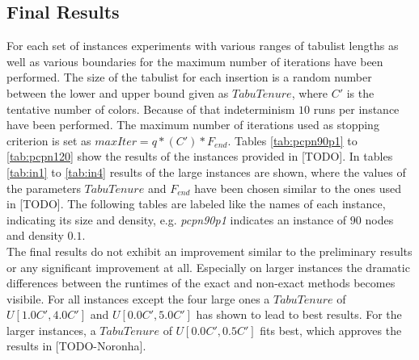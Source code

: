 \clearpage

\subsection{Final Results}
For each set of instances experiments with various ranges of tabulist lengths as well as various boundaries for the maximum number of iterations have been performed. The size of the tabulist for each insertion is a random number between the lower and upper bound given as $TabuTenure$, where $C'$ is the tentative number of colors. Because of that indeterminism $10$ runs per instance have been performed. The maximum number of iterations used as stopping criterion is set as $maxIter=q*(C')*F_{end}$. Tables \ref{tab:pcpn90p1} to \ref{tab:pcpn120} show the results of the instances provided in [TODO]. In tables \ref{tab:in1} to \ref{tab:in4} results of the large instances are shown, where the values of the parameters $TabuTenure$ and $F_{end}$ have been chosen similar to the ones used in [TODO]. The following tables are labeled like the names of each instance, indicating its size and density, e.g. \textit{pcpn90p1} indicates an instance of $90$ nodes and density $0.1$.\\
The final results do not exhibit an improvement similar to the preliminary results or any significant improvement at all. Especially on larger instances the dramatic differences between the runtimes of the exact and non-exact methods becomes visibile. For all instances except the four large ones a $TabuTenure$ of $U[1.0C',4.0C']$ and $U[0.0C',5.0C']$ has shown to lead to best results. For the larger instances, a $TabuTenure$ of $U[0.0C',0.5C']$ fits best, which approves the results in [TODO-Noronha].

